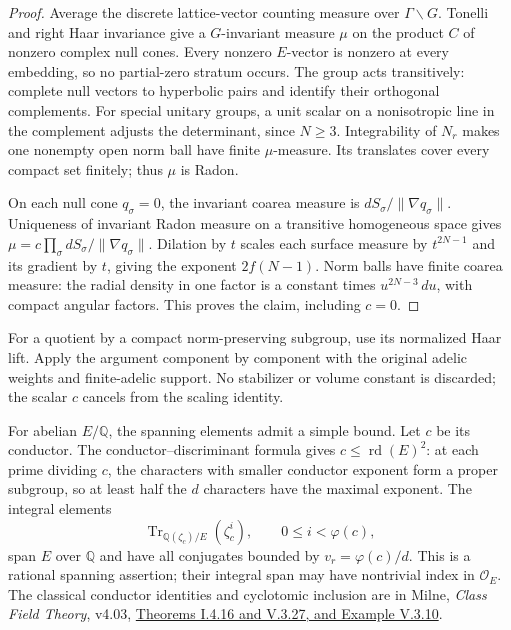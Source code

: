 \begin{proof}
Average the discrete lattice-vector counting measure over
$\Gamma\backslash G$. Tonelli and right Haar invariance give a
$G$-invariant measure $\mu$ on the product $C$ of nonzero complex null
cones. Every nonzero $E$-vector is nonzero at every embedding, so no
partial-zero stratum occurs. The group acts transitively: complete
null vectors to hyperbolic pairs and identify their orthogonal
complements. For special unitary groups, a unit scalar on a
nonisotropic line in the complement adjusts the determinant, since
$N\ge3$. Integrability of $N_r$ makes one nonempty open norm ball
have finite $\mu$-measure. Its translates cover every compact set
finitely; thus $\mu$ is Radon.

On each null cone $q_\sigma=0$, the invariant coarea measure is
$dS_\sigma/\|\nabla q_\sigma\|$. Uniqueness of invariant Radon
measure on a transitive homogeneous space gives
$\mu=c\prod_\sigma dS_\sigma/\|\nabla q_\sigma\|$.
Dilation by $t$ scales each surface measure by $t^{2N-1}$ and its
gradient by $t$, giving the exponent $2f(N-1)$. Norm balls have finite
coarea measure: the radial density in one factor is a constant times
$u^{2N-3}\,du$, with compact angular factors. This proves the claim,
including $c=0$.
\end{proof}

For a quotient by a compact norm-preserving subgroup, use its normalized
Haar lift. Apply the argument component by component with the original
adelic weights and finite-adelic support. No stabilizer or volume
constant is discarded; the scalar $c$ cancels from the scaling identity.

For abelian $E/\mathbb Q$, the spanning elements admit a simple bound.
Let $c$ be its conductor. The conductor--discriminant formula gives
$c\le\operatorname{rd}(E)^2$: at each prime dividing $c$, the
characters with smaller conductor exponent form a proper subgroup,
so at least half the $d$ characters have the maximal exponent.
The integral elements
\[
 \operatorname{Tr}_{\mathbb Q(\zeta_c)/E}(\zeta_c^i),
 \qquad0\le i<\varphi(c),
\]
span $E$ over $\mathbb Q$ and have all conjugates bounded by
$v_r=\varphi(c)/d$. This is a rational spanning assertion; their
integral span may have nontrivial index in $\mathcal O_E$.
The classical conductor identities and cyclotomic inclusion are in
Milne, \emph{Class Field Theory}, v4.03,
\href{https://www.jmilne.org/math/CourseNotes/CFT.pdf}{Theorems I.4.16
and V.3.27, and Example V.3.10}.

